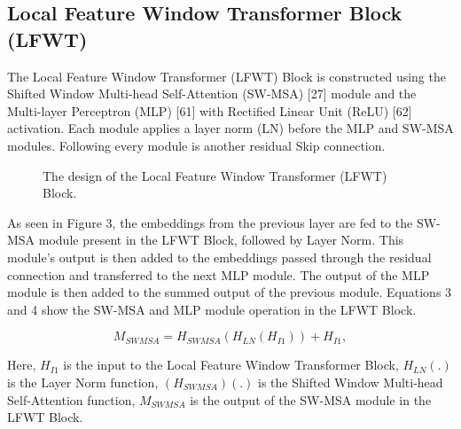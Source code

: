 \documentclass[twocolumn]{svjour3}          %
\begin{document}
\subsection{Local Feature Window Transformer Block (LFWT)}
The Local Feature Window Transformer (LFWT) Block is constructed using the Shifted Window Multi-head Self-Attention (SW-MSA) [27] module and the Multi-layer Perceptron (MLP) [61] with Rectified Linear Unit (ReLU) [62] activation. Each module applies a layer norm (LN) before the MLP and SW-MSA modules. Following every module is another residual Skip connection.

\begin{figure}
  \centering
   \caption {The design of the Local Feature Window Transformer (LFWT) Block.}
    \label{fig:3}
\end{figure}

As seen in Figure 3, the embeddings from the previous layer are fed to the SW-MSA module present in the LFWT Block, followed by Layer Norm. This module's output is then added to the embeddings passed through the residual connection and transferred to the next MLP module. The output of the MLP module is then added to the summed output of the previous module. Equations 3 and 4 show the SW-MSA and MLP module operation in the LFWT Block.

\begin{equation}
{M_{SWMSA}}= {H_{SWMSA}}({H_{LN}}({H_{I1}})) + {H_{I1}},
\end{equation}

Here,  ${H_{I1}}$ is the input to the Local Feature Window Transformer Block, ${H_{LN}}$$(.)$ is the Layer Norm function, $({H_{SWMSA}})$$(.)$ is the Shifted Window Multi-head Self-Attention function, ${M_{SWMSA}}$  is the output of the SW-MSA module in the LFWT Block.
\end{document}
